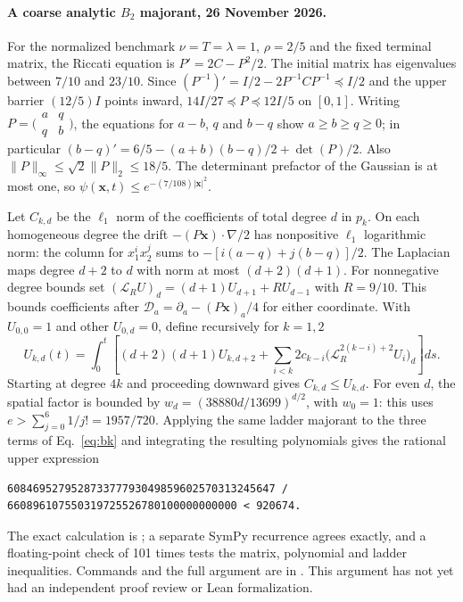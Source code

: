 \documentclass[11pt,a4paper]{article}
\newcommand{\x}{\mathbf x}
\begin{document}
\paragraph{A coarse analytic $B_2$ majorant, 26 November 2026.}
For the normalized benchmark $\nu=T=\lambda=1$, $\rho=2/5$ and the fixed
terminal matrix, the Riccati equation is $P'=2C-P^2/2$. The initial matrix
has eigenvalues between $7/10$ and $23/10$. Since
$(P^{-1})'=I/2-2P^{-1}CP^{-1}\preceq I/2$ and the upper barrier
$(12/5)I$ points inward, $14I/27\preceq P\preceq12I/5$ on $[0,1]$.
Writing $P=\bigl(\begin{smallmatrix}a&q\\q&b\end{smallmatrix}\bigr)$,
the equations for $a-b$, $q$ and $b-q$ show $a\ge b\ge q\ge0$; in
particular $(b-q)'=6/5-(a+b)(b-q)/2+\det(P)/2$. Also
$\|P\|_\infty\le\sqrt2\|P\|_2\le18/5$. The determinant prefactor of the
Gaussian is at most one, so $\psi(\x,t)\le e^{-(7/108)|\x|^2}$.

Let $C_{k,d}$ be the $\ell_1$ norm of the coefficients of total degree $d$
in $p_k$. On each homogeneous degree the drift
$-(P\x)\cdot\nabla/2$ has nonpositive $\ell_1$ logarithmic norm: the
column for $x_1^i x_2^j$ sums to $-[i(a-q)+j(b-q)]/2$. The Laplacian maps
degree $d+2$ to $d$ with norm at most $(d+2)(d+1)$. For nonnegative degree
bounds set $(\mathcal L_R U)_d=(d+1)U_{d+1}+R U_{d-1}$ with $R=9/10$.
This bounds coefficients after $\mathcal D_a=\partial_a-(P\x)_a/4$ for
either coordinate.
With $U_{0,0}=1$ and other $U_{0,d}=0$, define recursively for $k=1,2$
\[
 U_{k,d}(t)=\int_0^t\!\left[(d+2)(d+1)U_{k,d+2}
 +\sum_{i<k}2c_{k-i}\bigl(\mathcal L_R^{2(k-i)+2}U_i\bigr)_d\right]ds.
\]
Starting at degree $4k$ and proceeding downward gives
$C_{k,d}\le U_{k,d}$. For even $d$, the spatial factor is bounded by
$w_d=(38880d/13699)^{d/2}$, with $w_0=1$: this uses
$e>\sum_{j=0}^{6}1/j!=1957/720$. Applying the same ladder majorant to the
three terms of Eq.~\eqref{eq:bk} and integrating the resulting polynomials
gives the rational upper expression
\begin{verbatim}
608469527952873377793049859602570313245647 /
660896107550319725526780100000000000 < 920674.
\end{verbatim}
The exact calculation is ; a
separate SymPy recurrence agrees exactly, and a floating-point check of 101
times tests the matrix, polynomial and ladder inequalities. Commands and the
full argument are in . This
argument has not yet had an independent proof review or Lean formalization.
\end{document}
